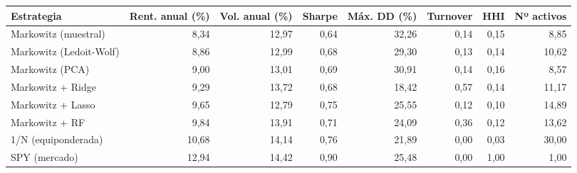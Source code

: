 \begin{tabular}{lrrrrrrr}
\toprule
Estrategia & Rent. anual (\%) & Vol. anual (\%) & Sharpe & Máx. DD (\%) & Turnover & HHI & Nº activos \\
\midrule
Markowitz (muestral) & 8,34 & 12,97 & 0,64 & 32,26 & 0,14 & 0,15 & 8,85 \\
Markowitz (Ledoit-Wolf) & 8,86 & 12,99 & 0,68 & 29,30 & 0,13 & 0,14 & 10,62 \\
Markowitz (PCA) & 9,00 & 13,01 & 0,69 & 30,91 & 0,14 & 0,16 & 8,57 \\
Markowitz + Ridge & 9,29 & 13,72 & 0,68 & 18,42 & 0,57 & 0,14 & 11,17 \\
Markowitz + Lasso & 9,65 & 12,79 & 0,75 & 25,55 & 0,12 & 0,10 & 14,89 \\
Markowitz + RF & 9,84 & 13,91 & 0,71 & 24,09 & 0,36 & 0,12 & 13,62 \\
1/N (equiponderada) & 10,68 & 14,14 & 0,76 & 21,89 & 0,00 & 0,03 & 30,00 \\
SPY (mercado) & 12,94 & 14,42 & 0,90 & 25,48 & 0,00 & 1,00 & 1,00 \\
\bottomrule
\end{tabular}
